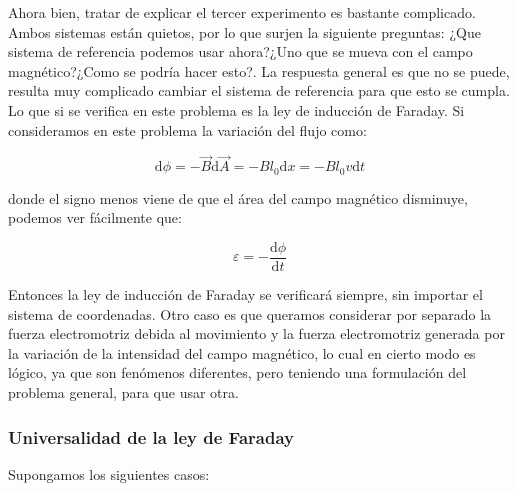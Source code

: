\documentclass[12pt,a4paper]{article}
\newcommand{\D}{\mathrm{d}}
\begin{document}
Ahora bien, tratar de explicar el tercer experimento es bastante complicado. Ambos sistemas están quietos, por lo que surjen la siguiente preguntas: ¿Que sistema de referencia podemos usar ahora?¿Uno que se mueva con el campo magnético?¿Como se podría hacer esto?. La respuesta general es que no se puede, resulta muy complicado cambiar el sistema de referencia para que esto se cumpla. \\

Lo que si se verifica en este problema es la ley de inducción de Faraday. Si consideramos en este problema la variación del flujo como:

$$
\D \phi =  - \vec{B} \D \vec{A} = - B l_0 \D x = - B  l_0 v \D t 
$$

donde el signo menos viene de que el área del campo magnético disminuye, podemos ver fácilmente que:

\begin{equation}
\varepsilon = - \dfrac{\D \phi}{\D t}
\end{equation}

Entonces la ley de inducción de Faraday se verificará siempre, sin importar el sistema de coordenadas. Otro caso es que queramos considerar por separado la fuerza electromotriz debida al movimiento y la fuerza electromotriz generada por la variación de la intensidad del campo magnético, lo cual en cierto modo es lógico, ya que son fenómenos diferentes, pero teniendo una formulación del problema general, para que usar otra. 

\subsubsection{Universalidad de la ley de Faraday}

Supongamos los siguientes casos:
\end{document}
